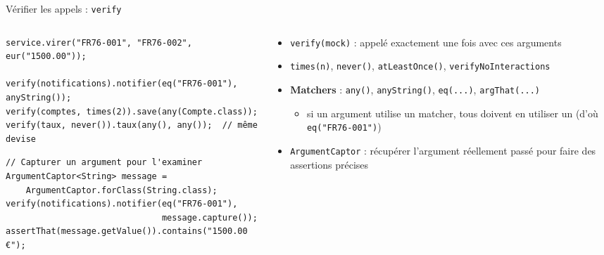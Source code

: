 \documentclass[aspectratio=169,10pt]{beamer}
\begin{document}
\begin{frame}[fragile]{Vérifier les appels : \texttt{verify}}
  \begin{columns}[T]
    \begin{column}{0.55\textwidth}
\begin{lstlisting}[basicstyle=\lstcode\scriptsize]
service.virer("FR76-001", "FR76-002", eur("1500.00"));

verify(notifications).notifier(eq("FR76-001"), anyString());
verify(comptes, times(2)).save(any(Compte.class));
verify(taux, never()).taux(any(), any());  // même devise
\end{lstlisting}
\begin{lstlisting}[basicstyle=\lstcode\scriptsize]
// Capturer un argument pour l'examiner
ArgumentCaptor<String> message =
    ArgumentCaptor.forClass(String.class);
verify(notifications).notifier(eq("FR76-001"),
                               message.capture());
assertThat(message.getValue()).contains("1500.00 €");
\end{lstlisting}
    \end{column}
    \begin{column}{0.42\textwidth}
      \begin{itemize}
        \item \texttt{verify(mock)} : appelé exactement une fois avec ces arguments
        \item \texttt{times(n)}, \texttt{never()}, \texttt{atLeastOnce()}, \texttt{verifyNoInteractions}
        \item \textbf{Matchers} : \texttt{any()}, \texttt{anyString()}, \texttt{eq(...)}, \texttt{argThat(...)}
          \begin{itemize}
            \item si un argument utilise un matcher, \alert{tous} doivent en utiliser un (d'où \texttt{eq("FR76-001")})
          \end{itemize}
        \item \texttt{ArgumentCaptor} : récupérer l'argument réellement passé pour faire des assertions précises
      \end{itemize}
    \end{column}
  \end{columns}
\end{frame}

\end{document}
